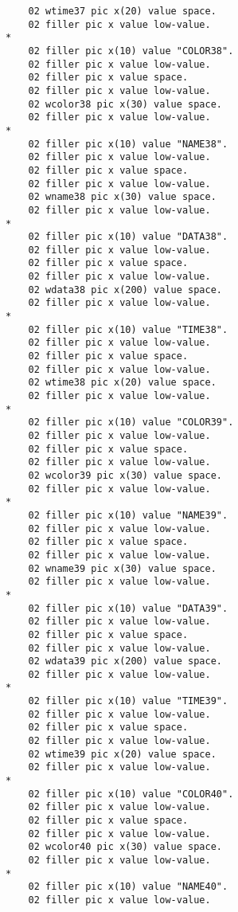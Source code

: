 {{{\begin{verbatim}
          02 wtime37 pic x(20) value space.
          02 filler pic x value low-value.
      *    
          02 filler pic x(10) value "COLOR38".
          02 filler pic x value low-value.
          02 filler pic x value space.
          02 filler pic x value low-value.
          02 wcolor38 pic x(30) value space.
          02 filler pic x value low-value.
      *    
          02 filler pic x(10) value "NAME38".
          02 filler pic x value low-value.
          02 filler pic x value space.
          02 filler pic x value low-value.
          02 wname38 pic x(30) value space.
          02 filler pic x value low-value.
      *    
          02 filler pic x(10) value "DATA38".
          02 filler pic x value low-value.
          02 filler pic x value space.
          02 filler pic x value low-value.
          02 wdata38 pic x(200) value space.
          02 filler pic x value low-value.
      *    
          02 filler pic x(10) value "TIME38".
          02 filler pic x value low-value.
          02 filler pic x value space.
          02 filler pic x value low-value.
          02 wtime38 pic x(20) value space.
          02 filler pic x value low-value.
      *    
          02 filler pic x(10) value "COLOR39".
          02 filler pic x value low-value.
          02 filler pic x value space.
          02 filler pic x value low-value.
          02 wcolor39 pic x(30) value space.
          02 filler pic x value low-value.
      *    
          02 filler pic x(10) value "NAME39".
          02 filler pic x value low-value.
          02 filler pic x value space.
          02 filler pic x value low-value.
          02 wname39 pic x(30) value space.
          02 filler pic x value low-value.
      *    
          02 filler pic x(10) value "DATA39".
          02 filler pic x value low-value.
          02 filler pic x value space.
          02 filler pic x value low-value.
          02 wdata39 pic x(200) value space.
          02 filler pic x value low-value.
      *    
          02 filler pic x(10) value "TIME39".
          02 filler pic x value low-value.
          02 filler pic x value space.
          02 filler pic x value low-value.
          02 wtime39 pic x(20) value space.
          02 filler pic x value low-value.
      *    
          02 filler pic x(10) value "COLOR40".
          02 filler pic x value low-value.
          02 filler pic x value space.
          02 filler pic x value low-value.
          02 wcolor40 pic x(30) value space.
          02 filler pic x value low-value.
      *    
          02 filler pic x(10) value "NAME40".
          02 filler pic x value low-value.

\end{verbatim}}}}
